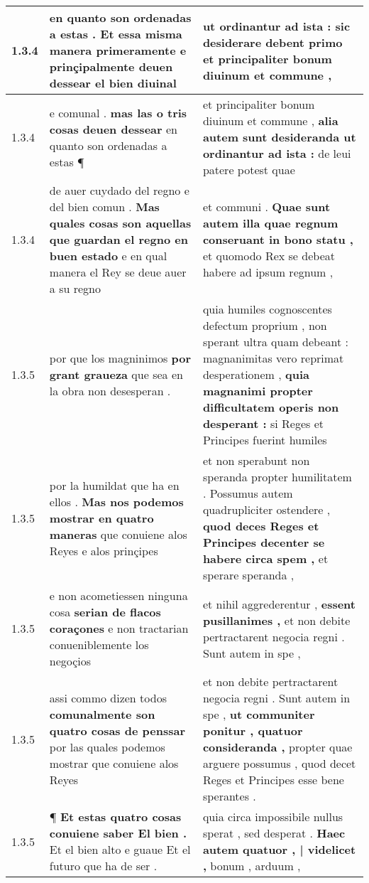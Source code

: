 \begin{tabular}{|p{1cm}|p{6.5cm}|p{6.5cm}|}
1.3.4 & en quanto son ordenadas a estas . \textbf{ Et essa misma manera primeramente } e prinçipalmente deuen dessear el bien diuinal & ut ordinantur ad ista : \textbf{ sic desiderare debent primo } et principaliter bonum diuinum et commune , \\\hline
1.3.4 & e comunal . \textbf{ mas las o tris cosas deuen dessear } en quanto son ordenadas a estas ¶ & et principaliter bonum diuinum et commune , \textbf{ alia autem sunt desideranda ut ordinantur ad ista : } de leui patere potest quae \\\hline
1.3.4 & de auer cuydado del regno e del bien comun . \textbf{ Mas quales cosas son aquellas que guardan el regno en buen estado } e en qual manera el Rey se deue auer a su regno & et communi . \textbf{ Quae sunt autem illa quae regnum conseruant in bono statu , } et quomodo Rex se debeat habere ad ipsum regnum , \\\hline
1.3.5 & por que los magninimos \textbf{ por grant graueza } que sea en la obra non desesperan . & quia humiles cognoscentes defectum proprium , non sperant ultra quam debeant : magnanimitas vero reprimat desperationem , \textbf{ quia magnanimi propter difficultatem operis non desperant : } si Reges et Principes fuerint humiles \\\hline
1.3.5 & por la humildat que ha en ellos . \textbf{ Mas nos podemos mostrar en quatro maneras } que conuiene alos Reyes e alos prinçipes & et non sperabunt non speranda propter humilitatem . Possumus autem quadrupliciter ostendere , \textbf{ quod deces Reges et Principes decenter se habere circa spem , } et sperare speranda , \\\hline
1.3.5 & e non acometiessen ninguna cosa \textbf{ serian de flacos coraçones } e non tractarian conueniblemente los negoçios & et nihil aggrederentur , \textbf{ essent pusillanimes , } et non debite pertractarent negocia regni . Sunt autem in spe , \\\hline
1.3.5 & assi commo dizen todos \textbf{ comunalmente son quatro cosas de penssar } por las quales podemos mostrar que conuiene alos Reyes & et non debite pertractarent negocia regni . Sunt autem in spe , \textbf{ ut communiter ponitur , quatuor consideranda , } propter quae arguere possumus , quod decet Reges et Principes esse bene sperantes . \\\hline
1.3.5 & ¶ \textbf{ Et estas quatro cosas conuiene saber El bien . } Et el bien alto e guaue Et el futuro que ha de ser . & quia circa impossibile nullus sperat , sed desperat . \textbf{ Haec autem quatuor , | videlicet , } bonum , arduum , \\\hline

\end{tabular}
